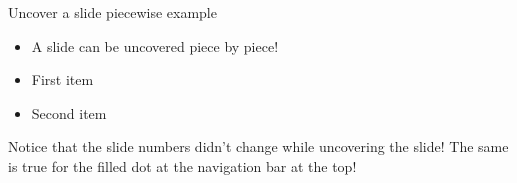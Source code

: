 \begin{frame}{Uncover a slide piecewise example}

  \begin{itemize}
    \item A slide can be uncovered piece by piece! \pause
    \item First item 
    \item Second item \pause
  \end{itemize}
  
  \vspace{0.4cm}
  
  Notice that the slide numbers didn't change while uncovering the slide! The same is true for the filled dot at the navigation bar at the top!

\end{frame}